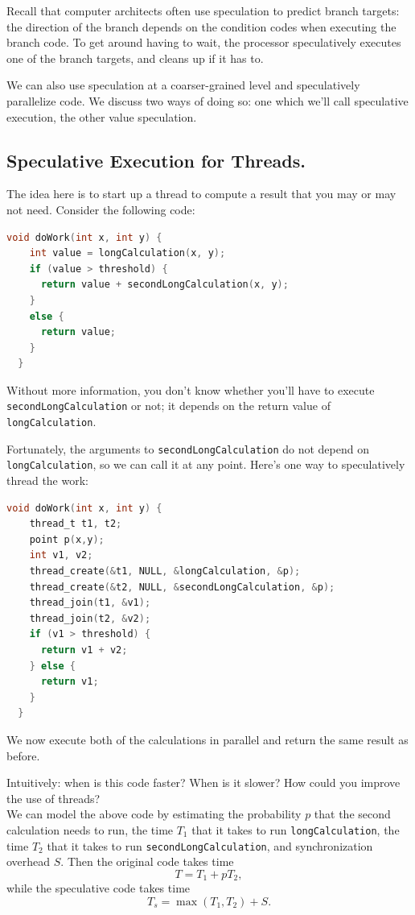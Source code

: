 \documentclass[a4paper]{report}
\begin{document}
Recall that computer architects often use speculation to predict branch
targets: the direction of the branch depends on the condition codes
when executing the branch code. To get around having to wait, the processor
speculatively executes one of the branch targets, and cleans up if it
has to.

We can also use speculation at a coarser-grained level and
speculatively parallelize code. We discuss two ways of doing so: one
which we'll call speculative execution, the other value speculation.

\subsection*{Speculative Execution for Threads.} The idea here is to
start up a thread to compute a result that you may or may not need.
Consider the following code:

{\small \begin{lstlisting}[language=C]
  void doWork(int x, int y) {
    int value = longCalculation(x, y);
    if (value > threshold) {
      return value + secondLongCalculation(x, y);
    }
    else {
      return value;
    }
  }
\end{lstlisting} }
Without more information, you don't know whether you'll have to execute
{\tt secondLongCalculation} or not; it depends on the return value of
{\tt longCalculation}. 

Fortunately, the arguments to {\tt secondLongCalculation} do not
depend on {\tt longCalculation}, so we can call it at any point. 
Here's one way to speculatively thread the work:

{\small \begin{lstlisting}[language=C]
  void doWork(int x, int y) {
    thread_t t1, t2;
    point p(x,y);
    int v1, v2;
    thread_create(&t1, NULL, &longCalculation, &p);
    thread_create(&t2, NULL, &secondLongCalculation, &p);
    thread_join(t1, &v1);
    thread_join(t2, &v2);
    if (v1 > threshold) {
      return v1 + v2;
    } else {
      return v1;
    }
  }
\end{lstlisting} }
We now execute both of the calculations in parallel and return the same
result as before.

{\sf Intuitively: when is this code faster? When is it slower? How
  could you improve the use of threads?}\\[4em]

We can model the above code by estimating the probability $p$ that
the second calculation needs to run, the time $T_1$ that it takes
to run {\tt longCalculation}, the time $T_2$ that it takes to run
{\tt secondLongCalculation}, and synchronization overhead $S$.
Then the original code takes time
\[ T = T_1 + p T_2, \]
while the speculative code takes time
\[ T_s = \max(T_1, T_2) + S.\]
\end{document}
